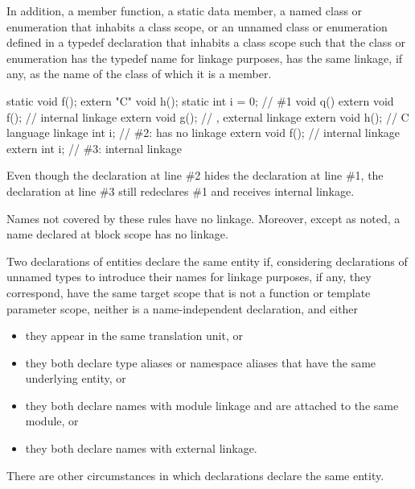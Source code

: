\pnum
In addition,
a member function,
a static data member,
a named class or enumeration that inhabits a class scope, or
an unnamed class or enumeration defined in a typedef declaration
that inhabits a class scope
such that the class or enumeration
has the typedef name for linkage purposes,
has the same linkage, if any, as the name of the class of which it is a member.

\pnum
\begin{example}
\begin{codeblock}
static void f();
extern "C" void h();
static int i = 0;               // \#1
void q() {
  extern void f();              // internal linkage
  extern void g();              // , external linkage
  extern void h();              // C language linkage
  int i;                        // \#2:  has no linkage
  {
    extern void f();            // internal linkage
    extern int i;               // \#3: internal linkage
  }
}
\end{codeblock}
Even though the declaration at line \#2 hides the declaration at line \#1,
the declaration at line \#3 still redeclares \#1 and receives internal linkage.
\end{example}

\pnum
{}%
Names not covered by these rules have no linkage. Moreover, except as
noted, a name declared at block scope has no
linkage.

\pnum
Two declarations of entities declare the same entity
if, considering declarations of unnamed types to introduce their names
for linkage purposes, if any,
they correspond,
have the same target scope that is not a function or template parameter scope,
neither is a name-independent declaration,
and either
\begin{itemize}
\item
they appear in the same translation unit, or
\item
they both declare type aliases or namespace aliases that have the same underlying entity, or
\item
they both declare names with module linkage and are attached to the same module, or
\item
they both declare names with external linkage.
\end{itemize}
\begin{note}
There are other circumstances in which declarations declare
the same entity.
\end{note}

